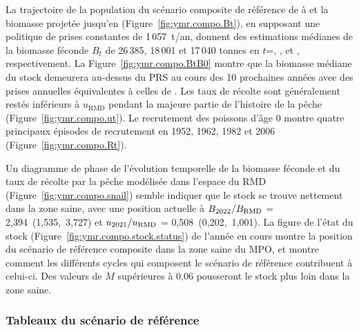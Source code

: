 \documentclass[11pt]{book}
\newcommand{\Bmsy}{B_\text{RMD}}
\newcommand{\umsy}{u_\text{RMD}}
\begin{document}
La trajectoire de la population du sc\'{e}nario composite de r\'{e}f\'{e}rence de \startYear{} \`{a} \currYear{} et la biomasse projet\'{e}e jusqu'en \projYear{} (Figure~\ref{fig:ymr.compo.Bt}), en supposant une politique de prises constantes de 1\,057~t/an, donnent des estimations m\'{e}dianes de la biomasse f\'{e}conde $B_t$ de 26\,385, 18\,001 et 17\,040 tonnes en $t$=\startYear, \currYear, et \projYear{}, respectivement.
La Figure~\ref{fig:ymr.compo.BtB0} montre que la biomasse m\'{e}diane du stock demeurera au-dessus du PRS au cours des 10 prochaines ann\'{e}es avec des prises annuelles \'{e}quivalentes \`{a} celles de \currYear{}.
Les taux de r\'{e}colte sont g\'{e}n\'{e}ralement rest\'{e}s inf\'{e}rieurs \`{a} $\umsy$ pendant la majeure partie de l'histoire de la p\^{e}che (Figure~\ref{fig:ymr.compo.ut}).
Le recrutement des poissons d'\^{a}ge 0 montre quatre principaux \'{e}pisodes de recrutement en 1952, 1962, 1982 et 2006 (Figure~\ref{fig:ymr.compo.Rt}).

Un diagramme de phase de l'\'{e}volution temporelle de la biomasse f\'{e}conde et du taux de r\'{e}colte par la p\^{e}che mod\'{e}lis\'{e}e dans l'espace du RMD (Figure~\ref{fig:ymr.compo.snail}) semble indiquer que le stock se trouve nettement dans la zone saine, avec une position actuelle \`{a} $B_{\currYear}/\Bmsy$ = 2,394~(1,535,~3,727)
et $u_{\prevYear}/\umsy$ = 0,508~(0,202,~1,001).
La figure de l'\'{e}tat du stock (Figure~\ref{fig:ymr.compo.stock.status}) de l'ann\'{e}e en cours montre la position du sc\'{e}nario de r\'{e}f\'{e}rence composite dans la zone saine du MPO, et montre comment les diff\'{e}rents cycles qui composent le sc\'{e}nario de r\'{e}f\'{e}rence contribuent \`{a} celui-ci.
Des valeurs de $M$ sup\'{e}rieures \`{a} 0,06 pousseront le stock plus loin dans la zone saine.


\subsubsection{Tableaux du sc\'{e}nario de r\'{e}f\'{e}rence}
\end{document}

